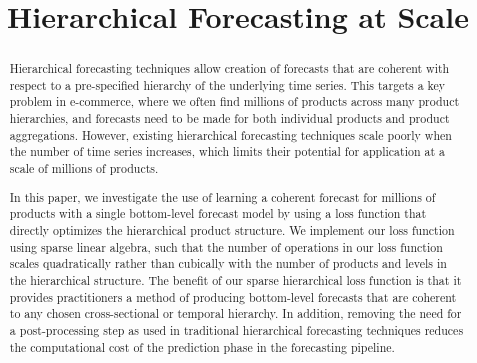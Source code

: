 \documentclass[preprint, 3p, times, twocolumn]{elsarticle}
\begin{document}
\begin{frontmatter}

\title{Hierarchical Forecasting at Scale}

\author{
}



\begin{abstract}
  Hierarchical forecasting techniques allow creation of forecasts that are coherent with respect to a pre-specified hierarchy of the underlying time series. This targets a key problem in e-commerce, where we often find millions of products across many product hierarchies, and forecasts need to be made for both individual products and product aggregations. However, existing hierarchical forecasting techniques scale poorly when the number of time series increases, which limits their potential for application at a scale of millions of products. 
  
  In this paper, we investigate the use of learning a coherent forecast for millions of products with a single bottom-level forecast model by using a loss function that directly optimizes the hierarchical product structure. We implement our loss function using sparse linear algebra, such that the number of operations in our loss function scales quadratically rather than cubically with the number of products and levels in the hierarchical structure. The benefit of our sparse hierarchical loss function is that it provides practitioners a method of producing bottom-level forecasts that are coherent to any chosen cross-sectional or temporal hierarchy. In addition, removing the need for a post-processing step as used in traditional hierarchical forecasting techniques reduces the computational cost of the prediction phase in the forecasting pipeline. 
  

\end{abstract}
\end{frontmatter}
\end{document}
